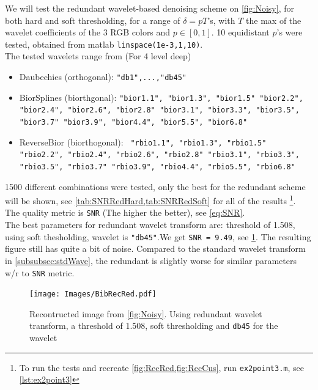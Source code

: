 \documentclass[a4paper]{article}
\begin{document}
	We will test the redundant wavelet-based denoising scheme on \cref{fig:Noisy}, for both hard and soft thresholding, for a range of $\delta = p T$'s, with $T$ the max of the wavelet coefficients of the 3 RGB colors and $p \in [0,1]$. 10 equidistant $p$'s were tested, obtained from matlab \texttt{linspace(\texttt{1e-3},1,10)}. \\
The tested wavelets range from (For 4 level deep)
\begin{itemize}
	\item Daubechies (orthogonal): \texttt{"db1",...,"db45"}
	\item BiorSplines (biorthgonal): \texttt{"bior1.1", "bior1.3", "bior1.5"
		"bior2.2", "bior2.4", "bior2.6", "bior2.8"
		"bior3.1", "bior3.3", "bior3.5", "bior3.7"
		"bior3.9", "bior4.4", "bior5.5", "bior6.8"}	
	\item ReverseBior (biorthogonal): \texttt{	"rbio1.1", "rbio1.3", "rbio1.5"
		"rbio2.2", "rbio2.4", "rbio2.6", "rbio2.8"	
		"rbio3.1", "rbio3.3", "rbio3.5", "rbio3.7"
		"rbio3.9", "rbio4.4", "rbio5.5", "rbio6.8"}
\end{itemize}
1500 different combinations were tested, only the best for the redundant scheme will be shown, see \cref{tab:SNRRedHard,tab:SNRRedSoft} for all of the results \footnote{To run the tests and recreate \cref{fig:RecRed,fig:RecCus}, run \texttt{ex2point3.m}, see \cref{lst:ex2point3}}. The quality metric is \texttt{SNR} (The higher the better), see \cref{eq:SNR}.\\

The best parameters for redundant wavelet transform are: threshold of 1.508, using soft thesholding, wavelet is \texttt{"db45"}.We get \texttt{SNR = 9.49}, see \cref{fig:RecRed}. The resulting figure still has quite a bit of noise. 	Compared to the standard wavelet transform in \cref{subsubsec:stdWave}, the redundant is slightly worse for similar parameters w/r to \texttt{SNR} metric.\\

    \begin{figure}[H]
	\centering
	\texttt{[image: Images/BibRecRed.pdf]}
	\caption{Recontructed image from \cref{fig:Noisy}. Using redundant wavelet transform, a threshold of 1.508, soft thresholding and \texttt{db45} for the wavelet}
	\label{fig:RecRed}
\end{figure}
\end{document}
